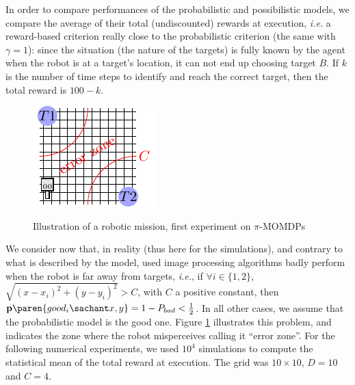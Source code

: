 In order to compare performances 
of the probabilistic and possibilistic models, 
we compare the average of their total (undiscounted) rewards at execution,
\textit{i.e.} a reward-based criterion really close to the probabilistic criterion
(the same with $\gamma=1$):
since the situation 
(the nature of the targets) 
is fully known 
by the agent when the robot 
is at a target's location, 
it can not end up choosing target $B$. 
If $k$ is the number of time steps to identify 
and reach the correct target, 
then the total reward is $100-k$. 

\begin{figure} \caption{Illustration of a robotic mission, first experiment on $\pi$-MOMDPs}\centering
\includegraphics[width=0.5\linewidth]{robotgrid.pdf} 
\label{robotgridfig}
\end{figure}

We consider now that, 
in reality (thus here for the simulations),
and contrary to what is described by the model, 
used image processing algorithms badly perform 
when the robot is far away from targets, 
\textit{i.e.}, if $\forall i \in \{1,2\}$, 
$\sqrt{(x-x_i)^2+(y-y_i)^2}>C$, 
with $C$ a positive constant, then
$\textbf{p} \paren{good_i \sachant x,y } = 1-P_{bad} < \frac{1}{2}$.  
In all other cases, we assume that 
the probabilistic model is the good one. 
Figure \ref{robotgridfig} illustrates this problem,
and indicates the zone where the robot misperceives
calling it ``error zone''.
For the following numerical experiments,
we used $10^4$ simulations to compute 
the statistical mean of the total reward at execution. 
The grid was $10 \times 10$, $D=10$ and $C=4$. 

